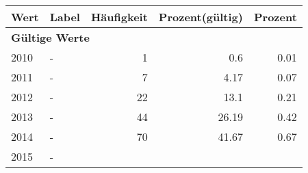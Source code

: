      \begin{longtable}{lXrrr}
     \toprule
     \textbf{Wert} & \textbf{Label} & \textbf{Häufigkeit} & \textbf{Prozent(gültig)} & \textbf{Prozent} \\
     \endhead
     \midrule
     \multicolumn{5}{l}{\textbf{Gültige Werte}}\\

     2010 &
     \multicolumn{1}{X}{ -  } &


       \num{1} &
       \num[round-mode=places,round-precision=2]{0.6} &
         \num[round-mode=places,round-precision=2]{0.01} \\

     2011 &
     \multicolumn{1}{X}{ -  } &


       \num{7} &
       \num[round-mode=places,round-precision=2]{4.17} &
         \num[round-mode=places,round-precision=2]{0.07} \\

     2012 &
     \multicolumn{1}{X}{ -  } &


       \num{22} &
       \num[round-mode=places,round-precision=2]{13.1} &
         \num[round-mode=places,round-precision=2]{0.21} \\

     2013 &
     \multicolumn{1}{X}{ -  } &


       \num{44} &
       \num[round-mode=places,round-precision=2]{26.19} &
         \num[round-mode=places,round-precision=2]{0.42} \\

     2014 &
     \multicolumn{1}{X}{ -  } &


       \num{70} &
       \num[round-mode=places,round-precision=2]{41.67} &
         \num[round-mode=places,round-precision=2]{0.67} \\

     2015 &
     \multicolumn{1}{X}{ -  } &



\end{longtable}
